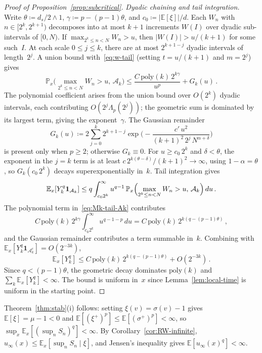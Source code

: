 \documentclass[aop]{imsart}
\theoremstyle{plain}
\theoremstyle{definition}
\newcommand{\E}{\mathbb{E}}
\renewcommand{\P}{\mathbb{P}}
\newcommand{\one}{\mathbf{1}}
\begin{document}
\begin{proof}[Proof of Proposition~\textup{\ref{prop:subcritical}}]
		\emph{Dyadic chaining and tail integration.}
		Write $\theta\coloneqq d_s/2\wedge 1$, $\gamma\coloneqq p-(p-1)\theta$, and $c_0\coloneqq|\E[\xi]|/d$. Each $W_n$ with $n\in[2^k,2^{k+1})$ decomposes into at most $k{+}1$ increments $W(I)$ over dyadic sub-intervals of $[0,N)$. If $\max_{2^k\leq n<N}W_n>u$, then $|W(I)|>u/(k{+}1)$ for some such~$I$. At each scale $0\leq j\leq k$, there are at most $2^{k+1-j}$ dyadic intervals of length~$2^j$. A union bound with~\eqref{eq:w-tail} (setting $t=u/(k{+}1)$ and $m=2^j$) gives
		\begin{equation}\label{eq:Mk-tail-Ak}
			\P_x\bigl(\max_{2^k\leq n<N}W_n>u,\,\mathcal{A}_k\bigr)
			\leq\frac{C\,\mathrm{poly}(k)\,2^{k\gamma}}{u^p}+G_k(u)\,.
		\end{equation}
		The polynomial coefficient arises from the union bound over $O(2^k)$ dyadic intervals, each contributing $O(2^j\Lambda_p(2^j))$; the geometric sum is dominated by its largest term, giving the exponent~$\gamma$. The Gaussian remainder
		\[
		G_k(u)\coloneqq 2\sum_{j=0}^k 2^{k+1-j}\exp\biggl(-\frac{c'\,u^2}{(k{+}1)^2\,2^j\,N^{\alpha+\delta}}\biggr)
		\]
		is present only when $p\geq 2$; otherwise $G_k\equiv 0$. For $u\geq c_0\,2^k$ and $\delta<\theta$, the exponent in the $j=k$ term is at least $c\,2^{k(\theta-\delta)}/(k{+}1)^2\to\infty$, using $1-\alpha=\theta$, so $G_k(c_0\,2^k)$ decays superexponentially in~$k$.
		Tail integration gives
		\begin{equation*}
			\E_x[Y_k^q\one_{\mathcal{A}_k}]
			\leq q\int_{c_0 2^k}^\infty u^{q-1}\,
			\P_x\Bigl(\max_{2^k\leq n<N}W_n>u,\,\mathcal{A}_k\Bigr)\,du\,.
		\end{equation*}
		The polynomial term in~\eqref{eq:Mk-tail-Ak} contributes
		\[
		C\,\mathrm{poly}(k)\,2^{k\gamma}\int_{c_0 2^k}^\infty u^{q-1-p}\,du=C\,\mathrm{poly}(k)\,2^{k(q-(p-1)\theta)}\,,
		\]
		and the Gaussian remainder contributes a term summable in~$k$. Combining with $\E_x[Y_k^q\one_{\mathcal{A}_k^c}]=O(2^{-3k})$,
		\[
		\E_x[Y_k^q]\leq C\,\mathrm{poly}(k)\,2^{k(q-(p-1)\theta)}+O(2^{-3k})\,.
		\]
		Since $q<(p-1)\theta$, the geometric decay dominates $\mathrm{poly}(k)$ and $\sum_k\E_x[Y_k^q]<\infty$. The bound is uniform in~$x$ since Lemma~\ref{lem:local-time} is uniform in the starting point.
	\end{proof}
	
	Theorem~\ref{thm:stab}(i) follows: setting $\xi(v)=\sigma(v)-1$ gives $\E[\xi]=\mu-1<0$ and $\E[(\xi^+)^p]\leq\E[(\sigma^+)^p]<\infty$, so $\sup_x\E_x[(\sup_n S_n)^q]<\infty$. By Corollary~\ref{cor:RW-infinite}, $u_\infty(x)\leq\E_x[\sup_n S_n\mid\xi]$, and Jensen's inequality gives $\E[u_\infty(x)^q]<\infty$.
	
\end{document}
